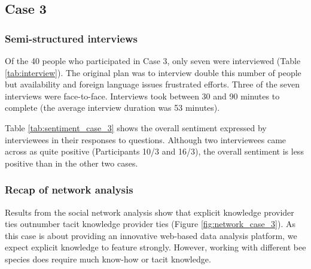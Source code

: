\subsection{Case 3}

\subsubsection{Semi-structured interviews}

Of the 40 people who participated in Case 3, only seven were interviewed (Table \ref{tab:interview}). The original plan was to interview double this number of people but availability and foreign language issues frustrated efforts. Three of the seven interviews were face-to-face. Interviews took between 30 and 90 minutes to complete (the average interview duration was 53 minutes). \medskip

Table \ref{tab:sentiment_case_3} shows the overall sentiment expressed by interviewees in their responses to questions. Although two interviewees came across as quite positive (Participants 10/3 and 16/3), the overall sentiment is less positive than in the other two cases.

\subsubsection{Recap of network analysis}

Results from the social network analysis show that explicit knowledge provider ties outnumber tacit knowledge provider ties (Figure \ref{fig:network_case_3}). As this case is about providing an innovative web-based data analysis platform, we expect explicit knowledge to feature strongly. However, working with different bee species does require much know-how or tacit knowledge. \medskip

